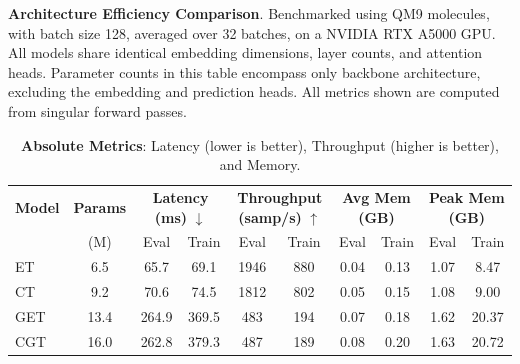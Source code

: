 
\begin{table}[t]
\centering
\caption{\textbf{Architecture Efficiency Comparison}. Benchmarked using QM9 molecules, with batch size 128, averaged over 32 batches, on a NVIDIA RTX A5000 GPU. All models share identical embedding dimensions, layer counts, and attention heads. Parameter counts in this table encompass only backbone architecture, excluding the embedding and prediction heads. All metrics shown are computed from singular forward passes.}
\label{tab:arch_speed_mem}
\small

\begin{subtable}{\linewidth}
\centering
\caption{\textbf{Absolute Metrics}: Latency (lower is better), Throughput (higher is better), and Memory.}
\label{tab:arch_speed_mem_abs}
\setlength{\tabcolsep}{4pt}
\begin{tabular}{l c cc cc cc cc}
\toprule
\textbf{Model} & \textbf{Params} & \multicolumn{2}{c}{\textbf{Latency (ms)} $\downarrow$} & \multicolumn{2}{c}{\textbf{Throughput (samp/s)} $\uparrow$} & \multicolumn{2}{c}{\textbf{Avg Mem (GB)}} & \multicolumn{2}{c}{\textbf{Peak Mem (GB)}} \\
\cmidrule(lr){3-4} \cmidrule(lr){5-6} \cmidrule(lr){7-8} \cmidrule(lr){9-10}
& (M) & Eval & Train & Eval & Train & Eval & Train & Eval & Train \\
\midrule
ET & 6.5 & 65.7 & 69.1 & 1946 & 880 & 0.04 & 0.13 & 1.07 & 8.47 \\
CT & 9.2 & 70.6 & 74.5 & 1812 & 802 & 0.05 & 0.15 & 1.08 & 9.00 \\
GET & 13.4 & 264.9 & 369.5 & 483 & 194 & 0.07 & 0.18 & 1.62 & 20.37 \\
CGT & 16.0 & 262.8 & 379.3 & 487 & 189 & 0.08 & 0.20 & 1.63 & 20.72 \\
\bottomrule
\end{tabular}
\end{subtable}

\vspace{1em}


\end{table}
